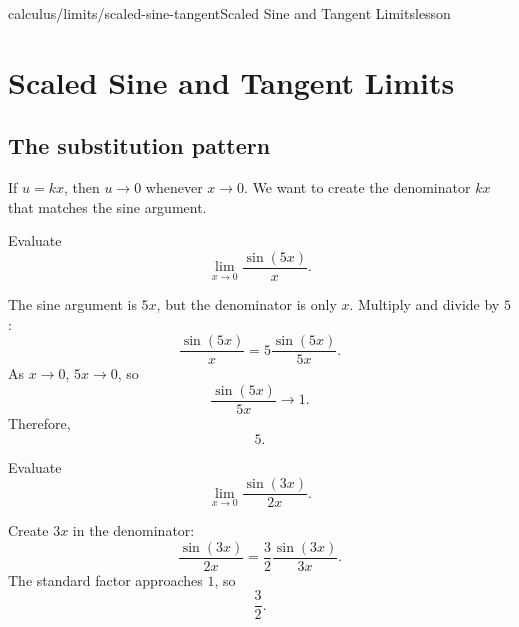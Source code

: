 \begin{webpage}{calculus/limits/scaled-sine-tangent}{Scaled Sine and Tangent Limits}{lesson}
\section{Scaled Sine and Tangent Limits}


\subsection{The substitution pattern}

If \(u=kx\), then \(u\to0\) whenever \(x\to0\). We want to create the denominator \(kx\) that matches the sine argument.

\begin{bgexample}[title={\(\sin(5x)/x\)}]
Evaluate
\[
  \lim_{x\to0}\frac{\sin(5x)}{x}.
\]

\begin{bgsolution}
The sine argument is \(5x\), but the denominator is only \(x\). Multiply and divide by \(5\):
\[
  \frac{\sin(5x)}{x}
  =5\frac{\sin(5x)}{5x}.
\]
As \(x\to0\), \(5x\to0\), so
\[
  \frac{\sin(5x)}{5x}\to1.
\]
Therefore,
\[
  \boxed{5}.
\]
\end{bgsolution}
\end{bgexample}

\begin{bgguided}[title={Keep the outside constant}]
Evaluate
\[
  \lim_{x\to0}\frac{\sin(3x)}{2x}.
\]

\begin{bgsolution}
Create \(3x\) in the denominator:
\[
  \frac{\sin(3x)}{2x}
  =\frac32\frac{\sin(3x)}{3x}.
\]
The standard factor approaches \(1\), so
\[
  \boxed{\frac32}.
\]
\end{bgsolution}
\end{bgguided}
\end{webpage}

